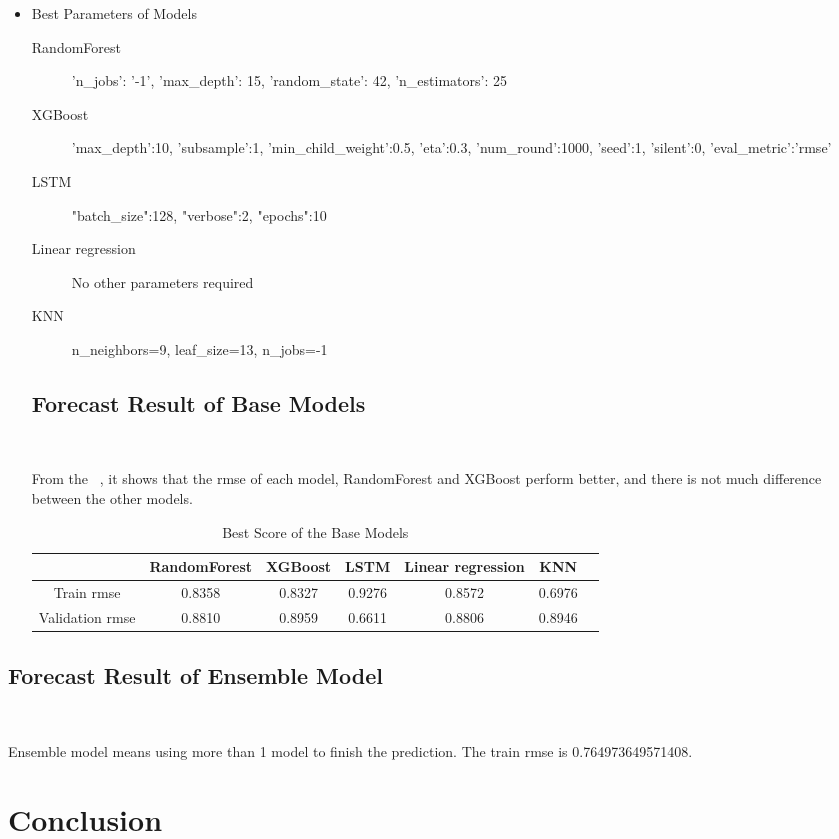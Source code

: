 \begin{itemize}
	\item Best Parameters of Models
	\begin{description}
		\item[RandomForest] 'n\_jobs': '-1', 'max\_depth': 15, 
		'random\_state': 42, 'n\_estimators': 25
		\item[XGBoost] 'max\_depth':10, 
		'subsample':1,
		'min\_child\_weight':0.5,
		'eta':0.3, 
		'num\_round':1000, 
		'seed':1,
		'silent':0,
		'eval\_metric':'rmse'
		\item[LSTM] "batch\_size":128,
		"verbose":2,
		"epochs":10
		\item[Linear regression] No other parameters required
		\item[KNN] n\_neighbors=9, leaf\_size=13, n\_jobs=-1
	\end{description}


\subsection{Forecast Result of Base Models}
\

From the  ~,
it shows that the rmse of 
each model, RandomForest and XGBoost 
perform better, and there is not much 
difference between the other models.

\begin{table}[h]  \centering
	\caption{Best Score of the Base Models}
	\label{tbl:best_score_base_models_old}
	\begin{tabular}{ccccccc}
		\toprule
		& RandomForest & XGBoost & LSTM & Linear regression & KNN\\
		\midrule
		Train rmse & 0.8358 & 0.8327 & 0.9276 & 0.8572 & 0.6976\\
		Validation rmse & 0.8810 & 0.8959 & 0.6611 & 0.8806 & 0.8946\\
		\bottomrule
	\end{tabular}
\end{table}
\end{itemize}

\subsection{Forecast Result of Ensemble Model }
\

Ensemble model means using 
more than 1 model to finish the prediction.
The train rmse is 0.764973649571408.

\section{Conclusion}

